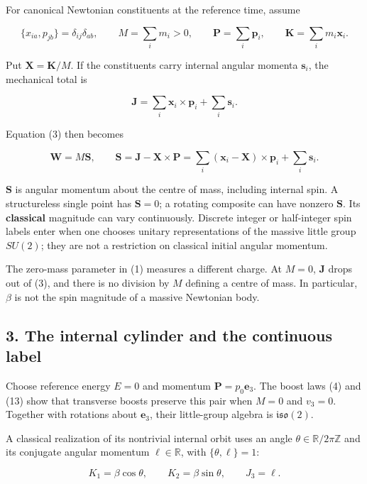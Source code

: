 \documentclass[11pt,a4paper]{article}
\begin{document}
For canonical Newtonian constituents at the reference time, assume

\[
\{x_{ia},p_{jb}\}=\delta_{ij}\delta_{ab},\qquad
M=\sum_i m_i>0,\qquad
\mathbf P=\sum_i\mathbf p_i,\qquad
\mathbf K=\sum_i m_i\mathbf x_i.
\]

Put \(\mathbf X=\mathbf K/M\). If the constituents carry internal
angular momenta \(\mathbf s_i\), the mechanical total is

\[
\mathbf J=\sum_i\mathbf x_i\times\mathbf p_i+\sum_i\mathbf s_i.
\]

Equation (3) then becomes

\[
\mathbf W=M\mathbf S,\qquad
\mathbf S=\mathbf J-\mathbf X\times\mathbf P
=\sum_i(\mathbf x_i-\mathbf X)\times\mathbf p_i+\sum_i\mathbf s_i.
\tag{5}
\]

\(\mathbf S\) is angular momentum about the centre of mass, including
internal spin. A structureless single point has \(\mathbf S=0\); a
rotating composite can have nonzero \(\mathbf S\). Its
\textbf{classical} magnitude can vary continuously. Discrete integer or
half-integer spin labels enter when one chooses unitary representations
of the massive little group \(SU(2)\); they are not a restriction on
classical initial angular momentum.

The zero-mass parameter in (1) measures a different charge. At \(M=0\),
\(\mathbf J\) drops out of (3), and there is no division by \(M\)
defining a centre of mass. In particular, \(\beta\) is not the spin
magnitude of a massive Newtonian body.

\hypertarget{the-internal-cylinder-and-the-continuous-label}{%
\subsection{3. The internal cylinder and the continuous
label}\label{the-internal-cylinder-and-the-continuous-label}}

Choose reference energy \(E=0\) and momentum
\(\mathbf P=p_0\mathbf e_3\). The boost laws (4) and (13) show that
transverse boosts preserve this pair when \(M=0\) and \(v_3=0\).
Together with rotations about \(\mathbf e_3\), their little-group
algebra is \(\mathfrak{iso}(2)\).

A classical realization of its nontrivial internal orbit uses an angle
\(\theta\in\mathbb R/2\pi\mathbb Z\) and its conjugate angular momentum
\(\ell\in\mathbb R\), with \(\{\theta,\ell\}=1\):

\[
K_1=\beta\cos\theta,\qquad K_2=\beta\sin\theta,
\qquad J_3=\ell. \tag{6}
\]
\end{document}
